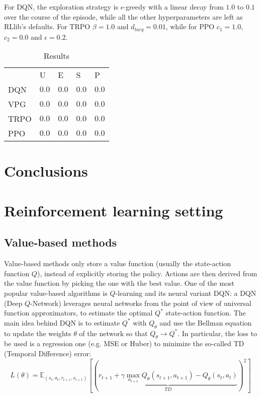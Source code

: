 \documentclass{article}
\begin{document}
For DQN, the exploration strategy is $\epsilon$-greedy with a linear decay from $1.0$ to $0.1$ over the course of the episode, while all the other hyperparameters are left as RLlib's defaults. For TRPO $\beta=1.0$ and $d_{targ}=0.01$, while for PPO $c_1=1.0$, $c_2=0.0$ and $\epsilon=0.2$.

\begin{table}[h]
  \caption{Results}
  \label{table:results}
  \centering
  \begin{tabular}{lllll}
    \toprule
    & U     & E     & S & P \\
    \cmidrule(r){2-5}
    DQN & $0.0$ & $0.0$ & $0.0$ & $0.0$ \\
    VPG & $0.0$ & $0.0$ & $0.0$ & $0.0$ \\
    TRPO & $0.0$ & $0.0$ & $0.0$ & $0.0$ \\
    PPO & $0.0$ & $0.0$ & $0.0$ & $0.0$ \\
    \bottomrule
  \end{tabular}
\end{table}

\section{Conclusions}

\newpage


\newpage
\appendix
\section{Reinforcement learning setting}

\subsection{Value-based methods}
Value-based methods only store a value function (usually the state-action function $Q$), instead of explicitly storing the policy. Actions are then derived from the value function by picking the one with the best value. One of the most popular value-based algorithms is $Q$-learning and its neural variant DQN: a DQN (Deep $Q$-Network) \cite{dqn} leverages neural networks from the point of view of universal function approximators, to estimate the optimal $Q^*$ state-action function. The main idea behind DQN is to estimate $Q^*$ with $Q_\theta$ and use the Bellman equation to update the weights $\theta$ of the network so that $Q_\theta\rightarrow Q^*$. In particular, the loss to be used is a regression one (e.g. MSE or Huber) to minimize the so-called TD (Temporal Difference) error:
$$
L(\theta)=\mathbb{E}_{(s_t,a_t,r_{t+1},s_{t+1})}\left[\left(\underbrace{r_{t+1}+\gamma\max_{a_{t+1}}Q_\theta(s_{t+1}, a_{t+1}) - Q_\theta(s_t, a_t)}_{TD}\right)^2\right]
$$
\end{document}

